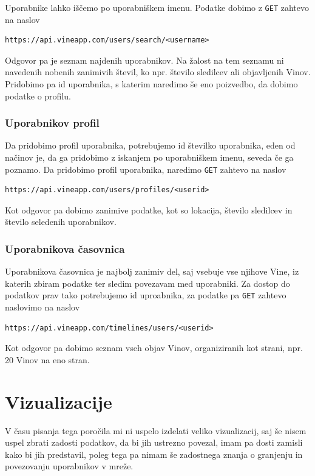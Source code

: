 \documentclass[a4paper,11pt]{article}
\begin{document}
Uporabnike lahko iščemo po uporabniškem imenu. Podatke dobimo z \texttt{GET} zahtevo na naslov

\begin{lstlisting}
https://api.vineapp.com/users/search/<username>
\end{lstlisting}
\noindent
Odgovor pa je seznam najdenih uporabnikov. Na žalost na tem seznamu ni navedenih nobenih zanimivih števil, ko npr. število sledilcev ali objavljenih Vinov. Pridobimo pa id uporabnika, s katerim naredimo še eno poizvedbo, da dobimo podatke o profilu.

\subsubsection{Uporabnikov profil}

Da pridobimo profil uporabnika, potrebujemo id številko uporabnika, eden od načinov je, da ga pridobimo z iskanjem po uporabniškem imenu, seveda če ga poznamo. Da pridobimo profil uporabnika, naredimo \texttt{GET} zahtevo na naslov

\begin{lstlisting}
https://api.vineapp.com/users/profiles/<userid>
\end{lstlisting}
\noindent
Kot odgovor pa dobimo zanimive podatke, kot so lokacija, število sledilcev in število seledenih uporabnikov.

\subsubsection{Uporabnikova časovnica}

Uporabnikova časovnica je najbolj zanimiv del, saj vsebuje vse njihove Vine, iz katerih zbiram podatke ter sledim povezavam med uporabniki. Za dostop do podatkov prav tako potrebujemo id uproabnika, za podatke pa \texttt{GET} zahtevo naslovimo na naslov

\begin{lstlisting}
https://api.vineapp.com/timelines/users/<userid>
\end{lstlisting}
\noindent
Kot odgovor pa dobimo seznam vseh objav Vinov, organiziranih kot strani, npr. 20 Vinov na eno stran.

\section{Vizualizacije}

V času pisanja tega poročila mi ni uspelo izdelati veliko vizualizacij, saj še nisem uspel zbrati zadosti podatkov, da bi jih ustrezno povezal, imam pa dosti zamisli kako bi jih predstavil, poleg tega pa nimam še zadostnega znanja o granjenju in povezovanju uporabnikov v mreže.
\end{document}
